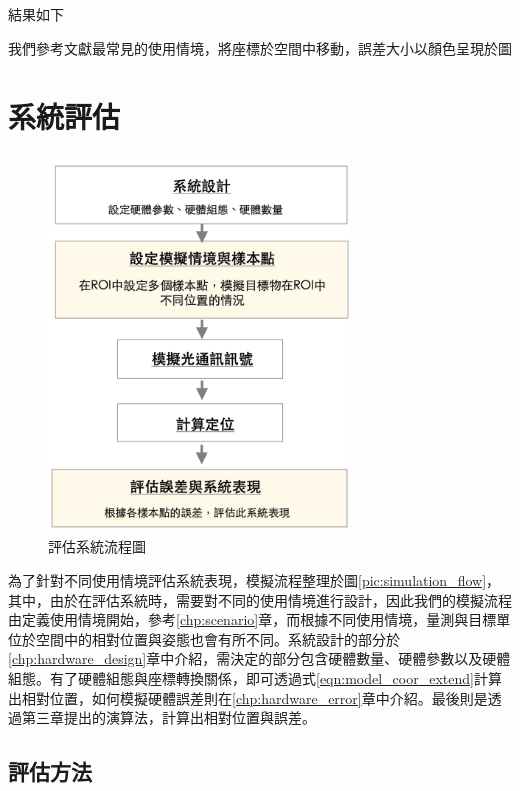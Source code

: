 結果如下



我們參考文獻最常見的使用情境，將座標於空間中移動，誤差大小以顏色呈現於圖










\section{系統評估}
\label{chp:evaluate}



\begin{figure}[ht]
    \centering
    \includegraphics[width=8cm]{ch4pic/evaluate_flow.png}
    \caption{評估系統流程圖}
    \label{pic:evaluate_flow}
\end{figure}

為了針對不同使用情境評估系統表現，模擬流程整理於圖\ref{pic:simulation_flow}，其中，由於在評估系統時，需要對不同的使用情境進行設計，因此我們的模擬流程由定義使用情境開始，參考\ref{chp:scenario}章，而根據不同使用情境，量測與目標單位於空間中的相對位置與姿態也會有所不同。系統設計的部分於\ref{chp:hardware_design}章中介紹，需決定的部分包含硬體數量、硬體參數以及硬體組態。有了硬體組態與座標轉換關係，即可透過式\ref{eqn:model_coor_extend}計算出相對位置，如何模擬硬體誤差則在\ref{chp:hardware_error}章中介紹。最後則是透過第三章提出的演算法，計算出相對位置與誤差。
\subsection{評估方法}
